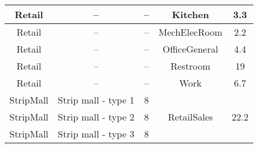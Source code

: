 \begin{table}
\begin{tabular}{|c|c|c|c|c|}
Retail                 & --                      & --                                                                                                            & Kitchen                      & 3.3                                                                                                            \\ \hline
Retail                 & --                      & --                                                                                                            & MechElecRoom                 & 2.2                                                                                                            \\ \hline
Retail                 & --                      & --                                                                                                            & OfficeGeneral                & 4.4                                                                                                            \\ \hline
Retail                 & --                      & --                                                                                                            & Restroom                     & 19                                                                                                             \\ \hline
Retail                 & --                      & --                                                                                                            & Work                         & 6.7                                                                                                            \\ \hline
StripMall              & Strip mall - type 1     & 8                                                                                                             & \multirow{3}{*}{RetailSales} & \multirow{3}{*}{22.2}                                                                                          \\ \cline{1-3}
StripMall              & Strip mall - type 2     & 8                                                                                                             &                              &                                                                                                                \\ \cline{1-3}
StripMall              & Strip mall - type 3     & 8                                                                                                             &                              &                                                                                                                \\ \hline

\end{tabular}
\end{table}
